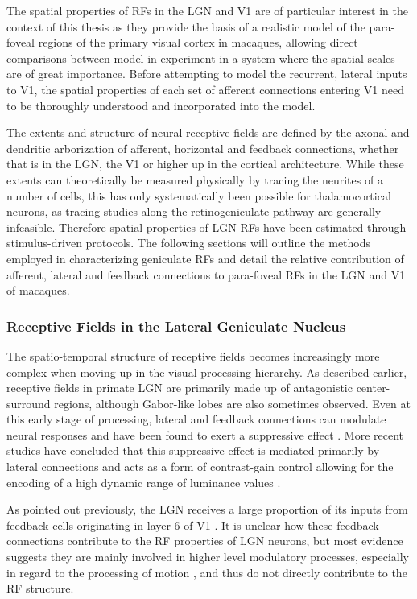 The spatial properties of RFs in the LGN and V1 are of particular
interest in the context of this thesis as they provide the basis of a
realistic model of the para-foveal regions of the primary visual
cortex in macaques, allowing direct comparisons between model in
experiment in a system where the spatial scales are of great
importance. Before attempting to model the recurrent, lateral inputs
to V1, the spatial properties of each set of afferent connections
entering V1 need to be thoroughly understood and incorporated into the
model.

The extents and structure of neural receptive fields are defined by
the axonal and dendritic arborization of afferent, horizontal and
feedback connections, whether that is in the LGN, the V1 or higher up
in the cortical architecture. While these extents can theoretically be
measured physically by tracing the neurites of a number of cells, this
has only systematically been possible for thalamocortical
neurons, as tracing studies along the retinogeniculate
pathway are generally infeasible. Therefore spatial properties of LGN
RFs have been estimated through stimulus-driven protocols. The
following sections will outline the methods employed in characterizing
geniculate RFs and detail the relative contribution of afferent,
lateral and feedback connections to para-foveal RFs in the LGN and V1
of macaques.

\subsubsection*{Receptive Fields in the Lateral Geniculate Nucleus}
\label{sec:LGNRF}

The spatio-temporal structure of receptive fields becomes increasingly
more complex when moving up in the visual processing hierarchy. As
described earlier, receptive fields in primate LGN are primarily made up
of antagonistic center-surround regions, although Gabor-like lobes are
also sometimes observed. Even at this early stage of processing,
lateral and feedback connections can modulate neural responses and
have been found to exert a suppressive effect \citep{Hubel1961}. More
recent studies have concluded that this suppressive effect is mediated
primarily by lateral connections and acts as a form of contrast-gain
control allowing for the encoding of a high dynamic range of luminance
values \citep{Bonin2005}.

As pointed out previously, the LGN receives a
large proportion of its inputs from feedback cells originating in
layer 6 of V1 \citep{Sherman2002}. It is unclear how these feedback
connections contribute to the RF properties of LGN neurons, but most
evidence suggests they are mainly involved in higher level modulatory
processes, especially in regard to the processing of motion
\citep{Sillito2006}, and thus do not directly contribute to the RF
structure.


